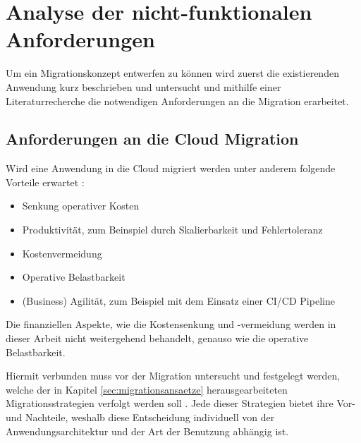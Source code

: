 \section{Analyse der nicht-funktionalen Anforderungen}
\label{sec:anforderungsanalyse}


Um ein Migrationskonzept entwerfen zu können wird zuerst die existierenden Anwendung kurz beschrieben und untersucht und mithilfe einer Literaturrecherche die notwendigen Anforderungen an die Migration erarbeitet.

\subsection{Anforderungen an die Cloud Migration}
Wird eine Anwendung in die Cloud migriert werden unter anderem folgende Vorteile erwartet \cite[Vgl. auch im Folgenden][03:23-05:36min]{AWS2019}:
\begin{itemize}
\item Senkung operativer Kosten
\item Produktivität, zum Beinspiel durch Skalierbarkeit und Fehlertoleranz
\item Kostenvermeidung
\item Operative Belastbarkeit
\item (Business) Agilität, zum Beispiel mit dem Einsatz einer CI/CD Pipeline
\end{itemize}

Die finanziellen Aspekte, wie die Kostensenkung und -vermeidung werden in dieser Arbeit nicht weitergehend behandelt, genauso wie die operative Belastbarkeit.

Hiermit verbunden muss vor der Migration untersucht und festgelegt werden, welche der in Kapitel \ref{sec:migrationsansaetze} herausgearbeiteten Migrationsstrategien verfolgt werden soll \cite[Vgl.][10:38-13:23min]{AWS2019}. Jede dieser Strategien bietet ihre Vor- und Nachteile, weshalb diese Entscheidung individuell von der Anwendungsarchitektur und der Art der Benutzung abhängig ist. \pagebreak

